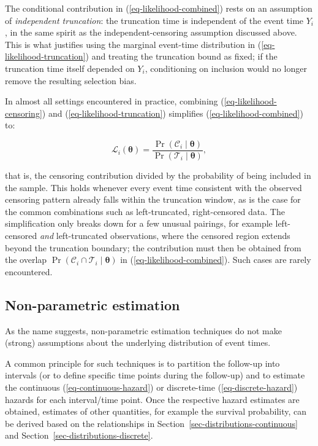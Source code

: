 \documentclass[
  letterpaper,
  krantz2]{style/krantz}
\begin{document}
The conditional contribution in (\ref{eq-likelihood-combined}) rests on
an assumption of \emph{independent
truncation}: the truncation time is
independent of the event time \(Y_i\), in the same spirit as the
independent-censoring assumption discussed above. This is what justifies
using the marginal event-time distribution in
(\ref{eq-likelihood-truncation}) and treating the truncation bound as
fixed; if the truncation time itself depended on \(Y_i\), conditioning
on inclusion would no longer remove the resulting selection bias.

In almost all settings encountered in practice, combining
(\ref{eq-likelihood-censoring}) and (\ref{eq-likelihood-truncation})
simplifies (\ref{eq-likelihood-combined}) to:

\[
\mathcal{L}_i(\boldsymbol{\theta}) = \frac{\Pr(\mathcal{C}_i \mid \boldsymbol{\theta})}{\Pr(\mathcal{T}_i \mid \boldsymbol{\theta})},
\]

that is, the censoring contribution divided by the probability of being
included in the sample. This holds whenever every event time consistent
with the observed censoring pattern already falls within the truncation
window, as is the case for the common combinations such as
left-truncated, right-censored data. The simplification only breaks down
for a few unusual pairings, for example left-censored \emph{and}
left-truncated observations, where the censored region extends beyond
the truncation boundary; the contribution must then be obtained from the
overlap
\(\Pr(\mathcal{C}_i \cap \mathcal{T}_i \mid \boldsymbol{\theta})\) in
(\ref{eq-likelihood-combined}). Such cases are rarely encountered.

\subsection{Non-parametric
estimation}\label{sec-surv-estimation-non-param}

As the name suggests, non-parametric estimation
 techniques do not make (strong)
assumptions about the underlying distribution of event times.

A common principle for such techniques is to partition the follow-up
into intervals (or to define specific time points during the follow-up)
and to estimate the continuous (\ref{eq-continuous-hazard}) or
discrete-time (\ref{eq-discrete-hazard}) hazards for each interval/time
point. Once the respective hazard estimates are obtained, estimates of
other quantities, for example the survival probability, can be derived
based on the relationships in Section~\ref{sec-distributions-continuous}
and Section~\ref{sec-distributions-discrete}.
\end{document}
